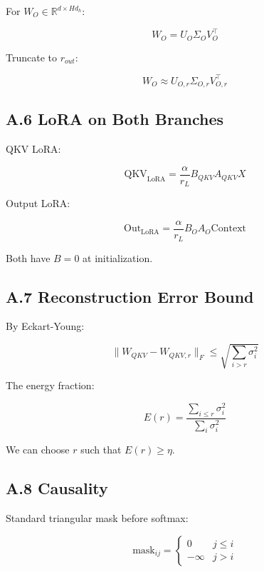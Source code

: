 For $W_O \in \mathbb{R}^{d \times H d_h}$:

\begin{equation}
W_O = U_O \Sigma_O V_O^\top
\end{equation}

Truncate to $r_{out}$:

\begin{equation}
W_O \approx U_{O, r} \Sigma_{O, r} V_{O, r}^\top
\end{equation}

\subsection{A.6 LoRA on Both Branches}

QKV LoRA:

\begin{equation}
\text{QKV}_\text{LoRA} = \frac{\alpha}{r_L} B_{QKV} A_{QKV} X
\end{equation}

Output LoRA:

\begin{equation}
\text{Out}_\text{LoRA} = \frac{\alpha}{r_L} B_O A_O \text{Context}
\end{equation}

Both have $B = 0$ at initialization.

\subsection{A.7 Reconstruction Error Bound}

By Eckart-Young:

\begin{equation}
\|W_{QKV} - W_{QKV, r}\|_F \leq \sqrt{\sum_{i > r} \sigma_i^2}
\end{equation}

The energy fraction:

\begin{equation}
E(r) = \frac{\sum_{i \leq r} \sigma_i^2}{\sum_i \sigma_i^2}
\end{equation}

We can choose $r$ such that $E(r) \geq \eta$.

\subsection{A.8 Causality}

Standard triangular mask before softmax:

\begin{equation}
\text{mask}_{ij} = \begin{cases} 0 & j \leq i \\ -\infty & j > i \end{cases}
\end{equation}

